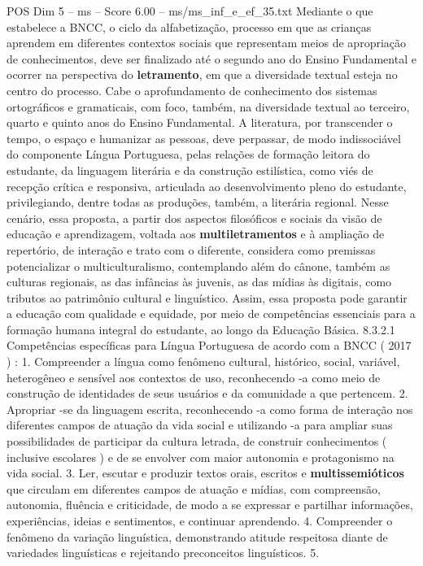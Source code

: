 \begin{textsample}{POS Dim 5 – ms – Score 6.00 – ms/ms\_inf\_e\_ef\_35.txt}
Mediante o que estabelece a BNCC, o ciclo da alfabetização, processo em que as crianças aprendem em diferentes contextos sociais que representam meios de apropriação de conhecimentos, deve ser finalizado até o segundo ano do Ensino Fundamental e ocorrer na perspectiva do \textbf{letramento}, em que a diversidade textual esteja no centro do processo.
Cabe o aprofundamento de conhecimento dos sistemas ortográficos e gramaticais, com foco, também, na diversidade textual ao terceiro, quarto e quinto anos do Ensino Fundamental.
A literatura, por transcender o tempo, o espaço e humanizar as pessoas, deve perpassar, de modo indissociável do componente Língua Portuguesa, pelas relações de formação leitora do estudante, da linguagem literária e da construção estilística, como viés de recepção crítica e responsiva, articulada ao desenvolvimento pleno do estudante, privilegiando, dentre todas as produções, também, a literária regional.
Nesse cenário, essa proposta, a partir dos aspectos filosóficos e sociais da visão de educação e aprendizagem, voltada aos \textbf{multiletramentos} e à ampliação de repertório, de interação e trato com o diferente, considera como premissas potencializar o multiculturalismo, contemplando além do cânone, também as culturas regionais, as das infâncias às juvenis, as das mídias às digitais, como tributos ao patrimônio cultural e linguístico.
Assim, essa proposta pode garantir a educação com qualidade e equidade, por meio de competências essenciais para a formação humana integral do estudante, ao longo da Educação Básica. 8.3.2.1 Competências específicas para Língua Portuguesa de acordo com a BNCC ( 2017 ) : 1.
Compreender a língua como fenômeno cultural, histórico, social, variável, heterogêneo e sensível aos contextos de uso, reconhecendo -a como meio de construção de identidades de seus usuários e da comunidade a que pertencem. 2.
Apropriar -se da linguagem escrita, reconhecendo -a como forma de interação nos diferentes campos de atuação da vida social e utilizando -a para ampliar suas possibilidades de participar da cultura letrada, de construir conhecimentos ( inclusive escolares ) e de se envolver com maior autonomia e protagonismo na vida social. 3.
Ler, escutar e produzir textos orais, escritos e \textbf{multissemióticos} que circulam em diferentes campos de atuação e mídias, com compreensão, autonomia, fluência e criticidade, de modo a se expressar e partilhar informações, experiências, ideias e sentimentos, e continuar aprendendo. 4.
Compreender o fenômeno da variação linguística, demonstrando atitude respeitosa diante de variedades linguísticas e rejeitando preconceitos linguísticos. 5.

\end{textsample}
